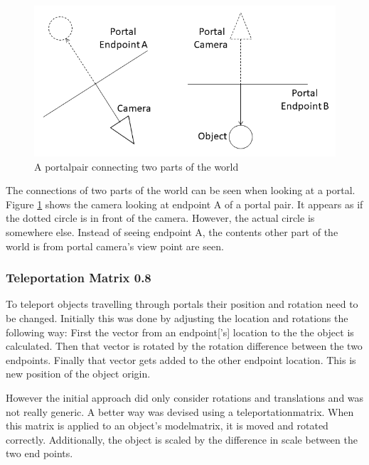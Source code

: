 \begin{figure}[H]
	\includegraphics[width=\linewidth]{images/portal.png}
	\caption{A \gls{portalpair} connecting two parts of the world}
	\label{fig:portal}
\end{figure}

The connections of two parts of the world can be seen when looking at a portal. Figure \ref{fig:portal} shows the camera looking at endpoint A of a portal pair. It appears as if the dotted circle is in front of the camera. However, the actual circle is somewhere else. Instead of seeing endpoint A, the contents other part of the world is from portal camera's view point are seen.

\subsubsection{Teleportation Matrix 0.8}
\label{section:teleportationmatrix}
To teleport objects travelling through portals their position and rotation need to be changed. Initially this was done by adjusting the location and rotations the following way: First the vector from an \gls{endpoint}['s] location to the the object is calculated. Then that vector is rotated by the rotation difference between the two endpoints. Finally that vector gets added to the other endpoint location. This is new position of the object origin.

However the initial approach did only consider rotations and translations and was not really generic. A better way was devised using a \gls{teleportationmatrix}. When this matrix is applied to an object's \gls{modelmatrix}, it is moved and rotated correctly. Additionally, the object is scaled by the difference in scale between the two end points.




